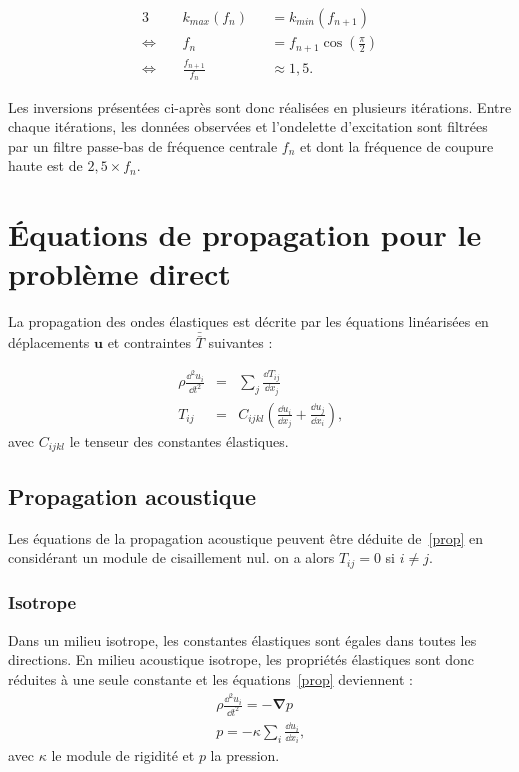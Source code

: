 \begin{alignat*}{3}
	  ~&k_{max}(f_{n}) &&= k_{min}(f_{n+1})\\
	\Leftrightarrow~~~~~ &  f_n &&= f_{n+1}\cos \left(\frac{\pi}{2} \right)\\
	 \Leftrightarrow~~~~~ & \frac{f_{n+1}}{f_n} && \approx  1,5.
\end{alignat*} 

Les inversions présentées ci-après sont donc réalisées en plusieurs itérations. Entre chaque itérations, les données observées et l'ondelette d'excitation sont filtrées par un filtre passe-bas de fréquence centrale $f_{n}$ et dont la fréquence de coupure haute est de $2,5 \times f_{n}$.


\section{Équations de propagation pour le problème direct}

La propagation des ondes élastiques est décrite par les équations linéarisées en déplacements $\bm{u}$ et contraintes $\bar{\bar T}$ suivantes \citep{mat_ac} : 

\begin{eqnarray}
	\rho \frac{\dd^2 u_{i}}{\dd t^2} &=& \displaystyle\sum_{j}\frac{\dd T_{ij}}{\dd x_{j}}\\
	T_{ij}&=&C_{ijkl}\left( \frac{\dd u_{i}}{\dd x_{j}} + \frac{\dd u_{j}}{\dd x_{i}}\right)\text{,}
	\label{prop}
\end{eqnarray}
avec $C_{ijkl}$ le tenseur des constantes élastiques.

\subsection{Propagation acoustique}
Les équations de la propagation acoustique peuvent être déduite de~\ref{prop} en considérant un module de cisaillement nul. on a alors $T_{ij}=0$ si $i\neq j$.

\subsubsection{Isotrope}
Dans un milieu isotrope, les constantes élastiques sont égales dans toutes les directions. En milieu acoustique isotrope, les propriétés élastiques sont donc réduites à une seule constante et les équations~\ref{prop} deviennent : 
\begin{eqnarray}
	\rho \frac{\dd^2 u_{i}}{\dd t^2} = -\bm{\nabla} p\\
	p=-\kappa \displaystyle\sum_{i} \frac{\dd u_{i}}{\dd x_{i}}\text{,}
\end{eqnarray}
avec $\kappa$ le module de rigidité et $p$ la pression.

